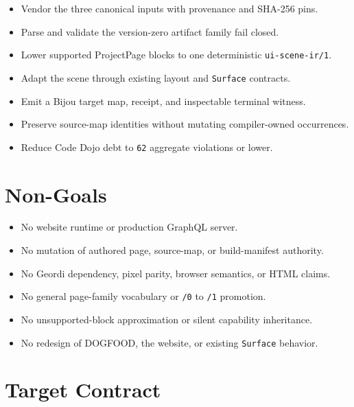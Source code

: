\begin{itemize}
\tightlist
\item
  Vendor the three canonical inputs with provenance and SHA-256 pins.
\item
  Parse and validate the version-zero artifact family fail closed.
\item
  Lower supported ProjectPage blocks to one deterministic \texttt{u\allowbreak{}i\allowbreak{}-\allowbreak{}s\allowbreak{}c\allowbreak{}e\allowbreak{}n\allowbreak{}e\allowbreak{}-\allowbreak{}i\allowbreak{}r\allowbreak{}/\allowbreak{}1}.
\item
  Adapt the scene through existing layout and \texttt{S\allowbreak{}u\allowbreak{}r\allowbreak{}f\allowbreak{}a\allowbreak{}c\allowbreak{}e} contracts.
\item
  Emit a Bijou target map, receipt, and inspectable terminal witness.
\item
  Preserve source-map identities without mutating compiler-owned occurrences.
\item
  Reduce Code Dojo debt to \texttt{6\allowbreak{}2} aggregate violations or lower.
\end{itemize}

\section{Non-Goals}\label{record-146-non-goals}

\begin{itemize}
\tightlist
\item
  No website runtime or production GraphQL server.
\item
  No mutation of authored page, source-map, or build-manifest authority.
\item
  No Geordi dependency, pixel parity, browser semantics, or HTML claims.
\item
  No general page-family vocabulary or \texttt{/\allowbreak{}0} to \texttt{/\allowbreak{}1} promotion.
\item
  No unsupported-block approximation or silent capability inheritance.
\item
  No redesign of DOGFOOD, the website, or existing \texttt{S\allowbreak{}u\allowbreak{}r\allowbreak{}f\allowbreak{}a\allowbreak{}c\allowbreak{}e} behavior.
\end{itemize}

\section{Target Contract}\label{record-146-target-contract}


